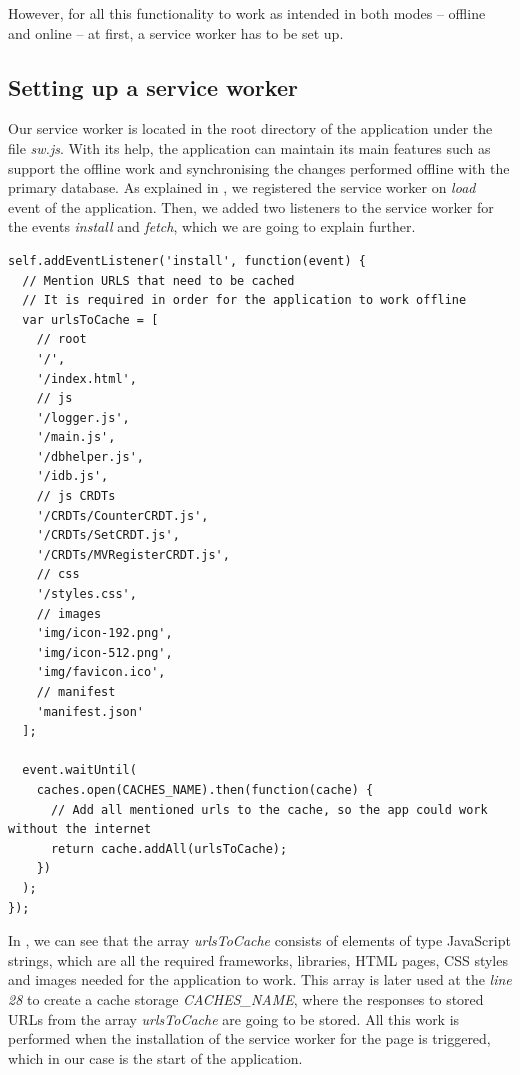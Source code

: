 However, for all this functionality to work as intended in both modes -- offline and online -- at first, a service worker has to be set up. 

\subsection*{Setting up a service worker}

Our service worker is located in the root directory of the application under the file \textit{sw.js}. With its help, the application can maintain its main features such as support the offline work and synchronising the changes performed offline with the primary database. As explained in , we registered the service worker on \textit{load} event of the application. Then, we added two listeners to the service worker for the events \textit{install} and \textit{fetch}, which we are going to explain further.

\begin{lstlisting}[caption={Code for caching necessary data for the client.}, label={lst:dev4}]
self.addEventListener('install', function(event) {
  // Mention URLS that need to be cached
  // It is required in order for the application to work offline
  var urlsToCache = [
    // root
    '/',
    '/index.html',
    // js
    '/logger.js',
    '/main.js',
    '/dbhelper.js',
    '/idb.js',
    // js CRDTs
    '/CRDTs/CounterCRDT.js',
    '/CRDTs/SetCRDT.js',
    '/CRDTs/MVRegisterCRDT.js',
    // css
    '/styles.css',
    // images
    'img/icon-192.png',
    'img/icon-512.png',
    'img/favicon.ico',
    // manifest
    'manifest.json'
  ];

  event.waitUntil(
    caches.open(CACHES_NAME).then(function(cache) {
      // Add all mentioned urls to the cache, so the app could work without the internet
      return cache.addAll(urlsToCache);
    })
  );
});
\end{lstlisting}

In , we can see that the array \textit{urlsToCache} consists of elements of type JavaScript strings, which are all the required frameworks, libraries, HTML pages, CSS styles and images needed for the application to work. This array is later used at the \textit{line 28} to create a cache storage \textit{CACHES\_NAME}, where the responses to stored URLs from the array \textit{urlsToCache} are going to be stored. All this work is performed when the installation of the service worker for the page is triggered, which in our case is the start of the application. 

